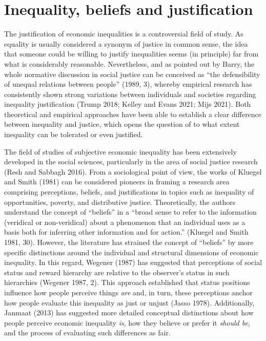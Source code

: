 \documentclass[
]{article}
\begin{document}
\section{Inequality, beliefs and
justification}\label{inequality-beliefs-and-justification}

The justification of economic inequalities is a controversial field of
study. As equality is usually considered a synonym of justice in common
sense, the idea that someone could be willing to justify inequalities
seems (in principle) far from what is considerably reasonable.
Nevertheless, and as pointed out by Barry, the whole normative
discussion in social justice can be conceived as ``the defensibility of
unequal relations between people'' (1989, 3), whereby empirical research
has consistently shown strong variations between individuals and
societies regarding inequality justification (Trump 2018; Kelley and
Evans 2021; Mijs 2021). Both theoretical and empirical approaches have
been able to establish a clear difference between inequality and
justice, which opens the question of to what extent inequality can be
tolerated or even justified.

The field of studies of subjective economic inequality has been
extensively developed in the social sciences, particularly in the area
of social justice research (Resh and Sabbagh 2016). From a sociological
point of view, the works of Kluegel and Smith (1981) can be considered
pioneers in framing a research area comprising perceptions, beliefs, and
justifications in topics such as inequality of opportunities, poverty,
and distributive justice. Theoretically, the authors understand the
concept of ``beliefs'' in a ``broad sense to refer to the information
(veridical or non-veridical) about a phenomenon that an individual uses
as a basis both for inferring other information and for action.''
(Kluegel and Smith 1981, 30). However, the literature has strained the
concept of ``beliefs'' by more specific distinctions around the
individual and structural dimensions of economic inequality. In this
regard, Wegener (1987) has suggested that perceptions of social status
and reward hierarchy are relative to the observer's status in such
hierarchies (Wegener 1987, 2). This approach established that status
positions influence how people perceive things \emph{are} and, in turn,
these perceptions anchor how people evaluate this inequality as just or
unjust (Jasso 1978). Additionally, Janmaat (2013) has suggested more
detailed conceptual distinctions about how people perceive economic
inequality \emph{is}, how they believe or prefer it \emph{should be},
and the process of evaluating such differences as fair.
\end{document}

